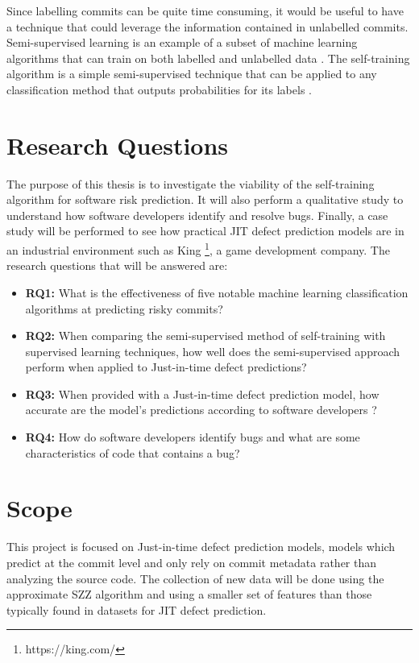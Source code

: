 \documentclass[../main.tex]{subfiles}
\begin{document}
Since labelling commits can be quite time consuming, it would be useful to have a technique that could leverage the information contained in unlabelled commits. Semi-supervised learning is an example of a subset of machine learning algorithms that can train on both labelled and unlabelled data \cite{zhu2005semi}. The self-training algorithm is a simple semi-supervised technique that can be applied to any classification method that outputs probabilities for its labels \cite{zhu2007semi}. 

\section{Research Questions}

The purpose of this thesis is to investigate the viability of the self-training algorithm for software risk prediction. It will also perform a qualitative study to understand how software developers identify and resolve bugs. Finally, a case study will be performed to see how practical JIT defect prediction models are in an industrial environment such as King \footnote{https://king.com/}, a game development company. The research questions that will be answered are:

\begin{itemize}
  \item \textbf{RQ1:} What is the effectiveness of five notable machine learning classification algorithms at predicting risky commits?
  \item \textbf{RQ2:} When comparing the semi-supervised method of self-training with supervised learning techniques, how well does the semi-supervised approach perform when applied to Just-in-time defect predictions?
   \item \textbf{RQ3:} When provided with a Just-in-time defect prediction model, how accurate are the model's predictions according to software developers ? 
  \item \textbf{RQ4:} How do software developers identify bugs and what are some characteristics of code that contains a bug?
\end{itemize}

\section{Scope}

This project is focused on Just-in-time defect prediction models, models which predict at the commit level and only rely on commit metadata rather than analyzing the source code. The collection of new data will be done using the approximate SZZ algorithm and using a smaller set of features than those typically found in datasets for JIT defect prediction. 
\end{document}
